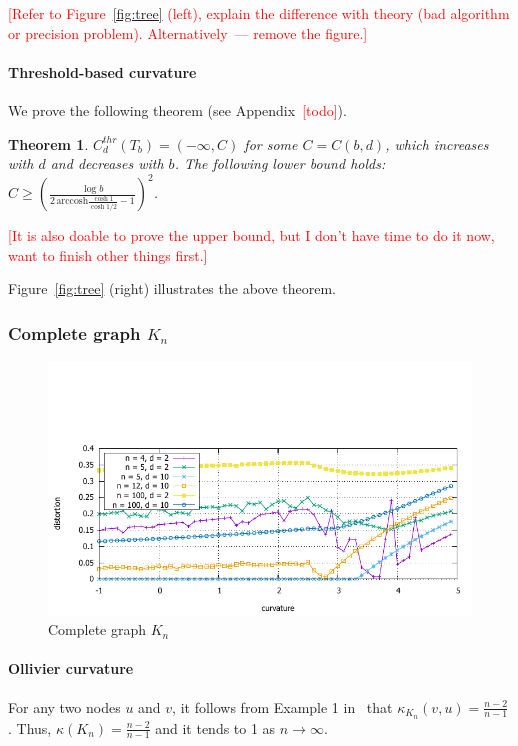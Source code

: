 \documentclass{article} %
\newtheorem{theorem}{Theorem}[section]
\begin{document}
\textcolor{red}{[Refer to Figure~\ref{fig:tree} (left), explain the difference with theory (bad algorithm or precision problem). Alternatively~--- remove the figure.]}

\paragraph{Threshold-based curvature} 

We prove the following theorem (see Appendix~\textcolor{red}{[todo]}).

\begin{theorem}\label{thm:tree_threshold}
$C_d^{thr}(T_b) = (-\infty, C)$ for some $C = C(b,d)$, which increases with $d$ and decreases with $b$. 
The following lower bound holds: $C \ge \left( \frac{\log b}{2 \, \mathrm{arccosh} \frac{\cosh 1}{\cosh 1/2} - 1} \right)^2$.
\end{theorem}

\textcolor{red}{[It is also doable to prove the upper bound, but I don't have time to do it now, want to finish other things first.]}

Figure~\ref{fig:tree} (right) illustrates the above theorem.

\subsubsection{Complete graph $K_n$}

\begin{figure}
    \centering
    \includegraphics[width = 0.8 \textwidth]{clique_distortion.pdf}
    \caption{Complete graph $K_n$}
    \label{fig:clique}
\end{figure}

\paragraph{Ollivier curvature}  
For any two nodes $u$ and $v$, it follows from Example 1 in~\citep{jost2014ollivier} that $\kappa_{K_n}(v, u) = \frac{n-2}{n-1}$. Thus, $\kappa(K_n) = \frac{n-2}{n-1}$ and it tends to 1 as $n \to \infty$.
\end{document}
